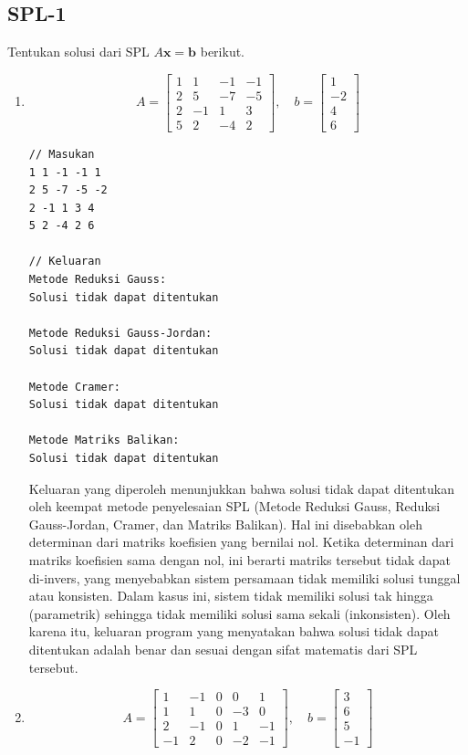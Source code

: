 \subsection{SPL-1}
Tentukan solusi dari SPL $A\textbf{x} = \textbf{b}$ berikut.

\begin{enumerate}[label=(\alph*)]
    \item
    \[A = \begin{bmatrix}
    1 & 1 & -1 & -1 \\
    2 & 5 & -7 & -5 \\
    2 & -1 & 1 & 3 \\
    5 & 2 & -4 & 2
\end{bmatrix}, \quad b = 
\begin{bmatrix}
    1 \\ -2 \\ 4 \\ 6
\end{bmatrix}\]

    \begin{lstlisting}[caption = spl-1a.txt]
// Masukan
1 1 -1 -1 1
2 5 -7 -5 -2
2 -1 1 3 4
5 2 -4 2 6

// Keluaran
Metode Reduksi Gauss:
Solusi tidak dapat ditentukan

Metode Reduksi Gauss-Jordan:
Solusi tidak dapat ditentukan

Metode Cramer:
Solusi tidak dapat ditentukan

Metode Matriks Balikan:
Solusi tidak dapat ditentukan\end{lstlisting}

Keluaran yang diperoleh menunjukkan bahwa solusi tidak dapat ditentukan oleh keempat metode penyelesaian SPL (Metode Reduksi Gauss, Reduksi Gauss-Jordan, Cramer, dan Matriks Balikan). Hal ini disebabkan oleh determinan dari matriks koefisien yang bernilai nol. Ketika determinan dari matriks koefisien sama dengan nol, ini berarti matriks tersebut tidak dapat di-invers, yang menyebabkan sistem persamaan tidak memiliki solusi tunggal atau konsisten. Dalam kasus ini, sistem tidak memiliki solusi tak hingga (parametrik) sehingga tidak memiliki solusi sama sekali (inkonsisten). Oleh karena itu, keluaran program yang menyatakan bahwa solusi tidak dapat ditentukan adalah benar dan sesuai dengan sifat matematis dari SPL tersebut.

\pagebreak
    \item
    \[ A = \begin{bmatrix}
    1 & -1 & 0 & 0 & 1 \\
    1 & 1 & 0 & -3 & 0 \\
    2 & -1 & 0 & 1 & -1 \\
    -1 & 2 & 0 & -2 & -1
\end{bmatrix}, \quad b =
\begin{bmatrix}
    3 \\ 6 \\ 5 \\ -1
\end{bmatrix}\]


\end{enumerate}
